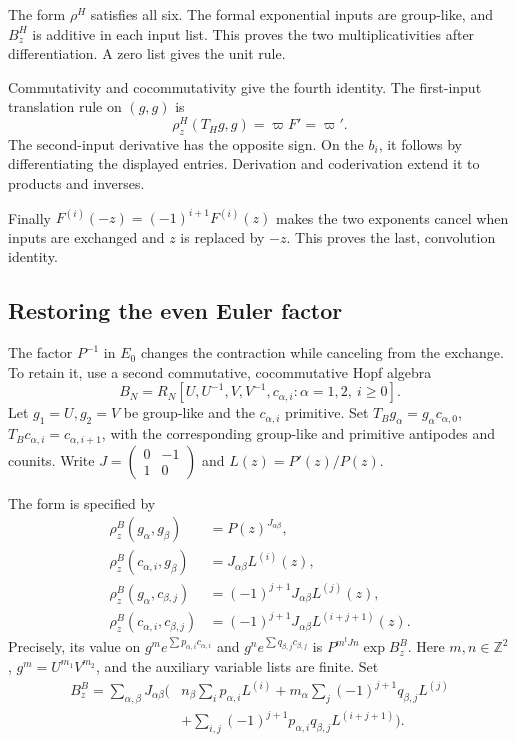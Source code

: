 The form $\rho^H$ satisfies all six.
The formal exponential inputs are group-like, and $B^H_z$
is additive in each input list. This proves the two
multiplicativities after differentiation.
A zero list gives the unit rule.

Commutativity and cocommutativity give the fourth identity.
The first-input translation rule on $(g,g)$ is
\[
 \rho^H_z(T_Hg,g)=\varpi F'=\varpi'.
\]
The second-input derivative has the opposite sign. On the $b_i$, it follows
by differentiating the displayed entries. Derivation and
coderivation extend it to products and inverses.

Finally $F^{(i)}(-z)=(-1)^{i+1}F^{(i)}(z)$ makes the two
exponents cancel when inputs are exchanged and $z$ is
replaced by $-z$. This proves the last, convolution identity.

\subsection{Restoring the even Euler factor}

The factor $P^{-1}$ in $E_0$ changes the contraction while
canceling from the exchange. To retain it, use a second
commutative, cocommutative Hopf algebra
\[
 B_N=R_N[U,U^{-1},V,V^{-1},c_{\alpha,i}:
                        \alpha=1,2,\ i\geq0].
\]
Let $g_1=U,g_2=V$ be group-like and the $c_{\alpha,i}$ primitive.
Set $T_Bg_\alpha=g_\alpha c_{\alpha,0}$,
$T_Bc_{\alpha,i}=c_{\alpha,i+1}$, with the corresponding
group-like and primitive antipodes and counits.
Write
$J=\left(\begin{smallmatrix}0&-1\\1&0\end{smallmatrix}\right)$
and $L(z)=P'(z)/P(z)$.

The form is specified by
\[
 \begin{aligned}
 \rho^B_z(g_\alpha,g_\beta)&=P(z)^{J_{\alpha\beta}},\\
 \rho^B_z(c_{\alpha,i},g_\beta)&=J_{\alpha\beta}L^{(i)}(z),\\
 \rho^B_z(g_\alpha,c_{\beta,j})
    &=(-1)^{j+1}J_{\alpha\beta}L^{(j)}(z),\\
 \rho^B_z(c_{\alpha,i},c_{\beta,j})
    &=(-1)^{j+1}J_{\alpha\beta}L^{(i+j+1)}(z).
 \end{aligned}
\]
Precisely, its value on
$g^me^{\sum p_{\alpha,i}c_{\alpha,i}}$ and
$g^ne^{\sum q_{\beta,j}c_{\beta,j}}$ is
$P^{m^tJn}\exp B^B_z$.
Here $m,n\in\mathbb Z^2$, $g^m=U^{m_1}V^{m_2}$,
and the auxiliary variable lists are finite. Set
\[
 \begin{split}
 B^B_z=\sum_{\alpha,\beta}J_{\alpha\beta}\biggl(
 &n_\beta\sum_i p_{\alpha,i}L^{(i)}
 +m_\alpha\sum_j(-1)^{j+1}q_{\beta,j}L^{(j)}\\
 &+\sum_{i,j}(-1)^{j+1}p_{\alpha,i}q_{\beta,j}L^{(i+j+1)}
 \biggr).
 \end{split}
\]

